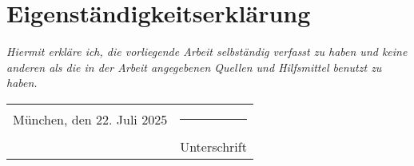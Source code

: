 \documentclass[12pt, twoside]{report}
\begin{document}
\printbibliography[heading=bibintoc]
% 
% 
\cleardoublepage


\chapter*{Eigenständigkeitserklärung}
\emph{Hiermit erkläre ich, die vorliegende Arbeit selbständig verfasst zu haben und keine anderen als die in der Arbeit angegebenen Quellen und Hilfsmittel benutzt zu haben.}

\vspace{2cm}
\noindent
\begin{tabular}{p{7cm} p{7cm}}
    München, den 22. Juli 2025 & \rule{6cm}{0.4pt} \\  
    & Unterschrift
\end{tabular}
\end{document}
